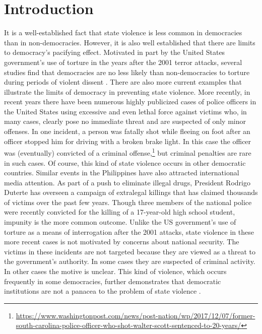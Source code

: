 \documentclass[11pt]{article}
\begin{document}
\section*{Introduction}
It is a well-established fact that state violence is less common in democracies than in non-democracies. However, it is also well established that there are limits to democracy's pacifying effect. Motivated in part by the United States government's use of torture in the years after the 2001 terror attacks, several studies find that democracies are no less likely than non-democracies to torture during periods of violent dissent \citep{Davenport2007AR,Davenport2007,DavenportMooreArmstrong2007,ConradMoore2010}. There are also more current examples that illustrate the limits of democracy in preventing state violence. More recently, in recent years there have been numerous highly publicized cases of police officers in the United States using excessive and even lethal force against victims who, in many cases, clearly pose no immediate threat and are suspected of only minor offenses. In one incident, a person was fatally shot while fleeing on foot after an officer stopped him for driving with a broken brake light. In this case the officer was (eventually) convicted of a criminal offense,\footnote{\url{https://www.washingtonpost.com/news/post-nation/wp/2017/12/07/former-south-carolina-police-officer-who-shot-walter-scott-sentenced-to-20-years/}} but criminal penalties are rare in such cases. Of course, this kind of state violence occurs in other democratic countries. Similar events in the Philippines have also attracted international media attention. As part of a push to eliminate illegal drugs, President Rodrigo Duterte has overseen a campaign of extralegal killings that has claimed thousands of victims over the past few years. Though three members of the national police were recently convicted for the killing of a 17-year-old high school student, impunity is the more common outcome. Unlike the US government's use of torture as a means of interrogation after the 2001 attacks, state violence in these more recent cases is not motivated by concerns about national security. The victims in these incidents are not targeted because they are viewed as a threat to the government's authority. In some cases they are suspected of criminal activity. In other cases the motive is unclear. This kind of violence, which occurs frequently in some democracies, further demonstrates that democratic institutions are not a panacea to the problem of state violence \citep{Moore2010}.  
\end{document}
